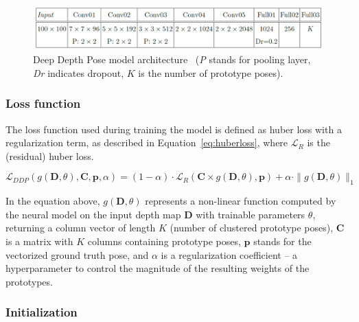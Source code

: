 \vspace{5mm}
\begin{figure}[H]
\begin{center}
  \includegraphics[width=\textwidth]{images/implementation/ddp.PNG}
  \caption[Deep Depth Pose model architecture.]{Deep Depth Pose model architecture~\cite{Marin18jvcir} (\textit{P} stands for pooling layer, \textit{Dr} indicates dropout, $K$ is the number of prototype poses).}
  \label{fig:ddp}
\end{center}
\end{figure}


\subsubsection{Loss function}

The loss function used during training the model is defined as huber loss with a regularization term, as described in Equation~\ref{eq:huberloss}, where $\mathcal{L}_R$ is the (residual) huber loss.\par

\begin{equation}
\mathcal{L}_{DDP}(g(\mathbf{D}, \theta), \mathbf{C}, \mathbf{p}, \alpha) = (1 - \alpha) \cdot \mathcal{L}_R(\mathbf{C} \times g(\mathbf{D}, \theta), \mathbf{p}) + \alpha \cdot \|g(\mathbf{D}, \theta)\|_1 \label{eq:huberloss}
\end{equation} 

\noindent In the equation above, $g(\mathbf{D}, \theta)$ represents a non-linear function computed by the neural model on the input depth map $\mathbf{D}$ with trainable parameters $\theta$, returning a column vector of length $K$ (number of clustered prototype poses), $\mathbf{C}$ is a matrix with $K$ columns containing prototype poses, $\mathbf{p}$ stands for the vectorized ground truth pose,  and $\alpha$ is a regularization coefficient  – a hyperparameter to control the magnitude of the resulting weights of the prototypes.

\subsubsection{Initialization}

